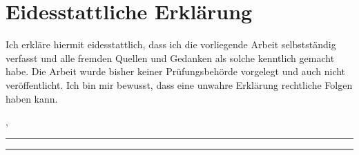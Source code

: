 \chapter*{Eidesstattliche Erklärung}

\pagestyle{plain}

Ich erkläre hiermit eidesstattlich, dass ich die vorliegende Arbeit selbstständig verfasst und alle fremden Quellen und Gedanken als solche kenntlich gemacht habe. Die Arbeit wurde bisher keiner Prüfungsbehörde
vorgelegt und auch nicht veröffentlicht. Ich bin mir bewusst, dass eine unwahre Erklärung rechtliche Folgen haben kann.

\vfill

\vspace*{\baselineskip}
\noindent \begin{minipage}{\textwidth}
	\noindent \begin{minipage}{0.49\textwidth}
		\begin{flushleft}
			, \rule{3cm}{0.5pt}
		\end{flushleft}
	\end{minipage} \hfill
	\begin{minipage}{0.49\textwidth}
		\begin{flushright}
			\rule{4cm}{0.5pt}
		\end{flushright}
	\end{minipage}
\end{minipage}

\newpage